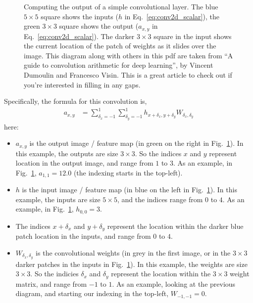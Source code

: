 \documentclass{article}
\begin{document}
\begin{figure}[H]
    \caption{\label{fig:numerical_no_padding_no_strides} 
      Computing the output of a simple convolutional layer.  The blue $5 \times 5$ square shows the inputs ($h$ in Eq.~\ref{eq:conv2d_scalar}), the green $3 \times 3$ square shows the output ($a_{x,y}$ in Eq.~\ref{eq:conv2d_scalar}).  The darker $3\times 3$ square in the input shows the current location of the patch of weights as it slides over the image.  This diagram along with others in this pdf are taken from ``A guide to convolution arithmetic for deep learning'', by Vincent Dumoulin and Francesco Visin.  This is a great article to check out if you're interested in filling in any gaps.
    }
\end{figure}
Specifically, the formula for this convolution is,
\begin{align}
  \label{eq:conv2d_scalar}
  a_{x,y} &= \sum_{\delta_x=-1}^1 \sum_{\delta_y=-1}^1 h_{x+\delta_x, y+\delta_y} W_{\delta_x, \delta_y}
\end{align}
here:
\begin{itemize}
  \item $a_{x, y}$ is the output image / feature map (in green on the right in Fig.~\ref{fig:numerical_no_padding_no_strides}). In this example, the outputs are size $3\times 3$. So the indices $x$ and $y$ represent location in the output image, and range from $1$ to $3$.  As an example, in Fig.~\ref{fig:numerical_no_padding_no_strides}, $a_{1, 1} = 12.0$ (the indexing starts in the top-left).
  \item $h$ is the input image / feature map (in blue on the left in Fig.~\ref{fig:numerical_no_padding_no_strides}). In this example, the inputs are size $5\times 5$, and the indices range from $0$ to $4$.  As an example, in Fig.~\ref{fig:numerical_no_padding_no_strides}, $h_{0, 0} = 3$.
  \item The indices $x + \delta_x$ and $y + \delta_y$ represent the location within the darker blue patch location in the inputs, and range from $0$ to $4$.  
  \item $W_{\delta_x, \delta_y}$ is the convolutional weights (in grey in the first image, or in the $3 \times 3$ darker patches in the inputs in Fig.~\ref{fig:numerical_no_padding_no_strides}).  In this example, the weights are size $3 \times 3$. So the indicies $\delta_x$ and $\delta_y$ represent the location within the $3 \times 3$ weight matrix, and range from $-1$ to $1$. As an example, looking at the previous diagram, and starting our indexing in the top-left, $W_{-1, -1} = 0$.
\end{itemize}
\end{document}
